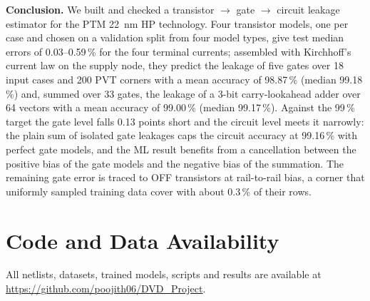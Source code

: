 \textbf{Conclusion.} We built and checked a transistor $\rightarrow$ gate $\rightarrow$ circuit leakage estimator for the PTM \SI{22}{\nano\meter} HP technology. Four transistor models, one per case and chosen on a validation split from four model types, give test median errors of 0.03--0.59\,\% for the four terminal currents; assembled with Kirchhoff's current law on the supply node, they predict the leakage of five gates over 18 input cases and 200 PVT corners with a mean accuracy of 98.87\,\% (median 99.18\,\%) and, summed over 33 gates, the leakage of a 3-bit carry-lookahead adder over 64 vectors with a mean accuracy of 99.00\,\% (median 99.17\,\%). Against the 99\,\% target the gate level falls 0.13 points short and the circuit level meets it narrowly: the plain sum of isolated gate leakages caps the circuit accuracy at 99.16\,\% with perfect gate models, and the ML result benefits from a cancellation between the positive bias of the gate models and the negative bias of the summation. The remaining gate error is traced to OFF transistors at rail-to-rail bias, a corner that uniformly sampled training data cover with about 0.3\,\% of their rows.

\section*{Code and Data Availability}
All netlists, datasets, trained models, scripts and results are available at \url{https://github.com/poojith06/DVD_Project}.
